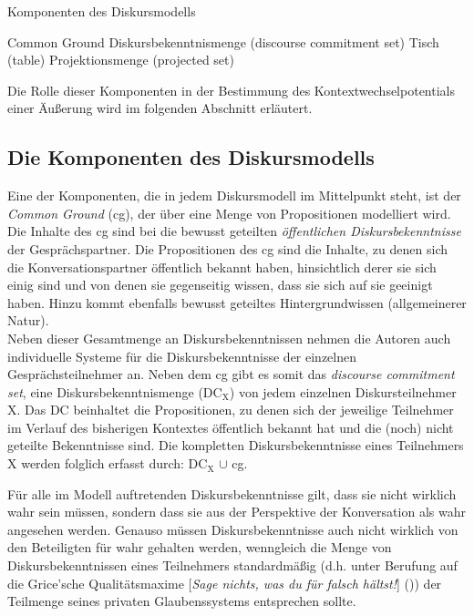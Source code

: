 \begin{exe}
	\ex\label{227} 
		Komponenten des Diskursmodells
		\begin{xlist}	
			\ex\label{227a} Common Ground 
			\ex\label{227b} Diskursbekenntnismenge (discourse commitment set) 
			\ex\label{227c} Tisch (table)	
			\ex\label{227d} Projektionsmenge (projected set) 
		\end{xlist}
\end{exe}
Die Rolle dieser Komponenten in der Bestimmung des Kontextwechselpotentials einer Äußerung wird im folgenden Abschnitt erläutert.

\subsection{Die Komponenten des Diskursmodells}\largerpage
Eine der Komponenten, die in jedem Diskursmodell im Mittelpunkt steht, ist der \textit{Common Ground} (cg), der über eine Menge von Propositionen modelliert wird. Die Inhalte des cg sind bei \citet{Farkas2010} die bewusst geteilten \emph{öffentlichen Diskursbekenntnisse} der Gesprächspartner. Die Propositionen des cg sind die Inhalte, zu denen sich die Konversationspartner öffentlich bekannt haben, hinsichtlich derer sie sich einig sind und von denen sie gegenseitig wissen, dass sie sich auf sie geeinigt haben. Hinzu kommt ebenfalls bewusst geteiltes Hintergrundwissen (allgemeine\-rer Natur).\\

\noindent 
Neben dieser Gesamtmenge an Diskursbekenntnissen nehmen die Autoren auch individuelle Systeme für die Diskursbekenntnisse der einzelnen Gesprächsteilnehmer an. Neben dem cg gibt es somit das \textit{discourse commitment set}, eine Diskursbekenntnismenge  ($\textrm{DC}_{\textrm{X}}$) von jedem einzelnen Diskursteilnehmer X. Das DC beinhaltet die Propositionen, zu denen sich der jeweilige Teilnehmer im Verlauf des bisherigen Kontextes öffentlich bekannt hat und die (noch) nicht geteilte Bekenntnisse sind. Die kompletten Diskursbekenntnisse eines Teilnehmers X werden folglich erfasst durch: $\textrm{DC}_{\textrm{X}}$ $\cup$ cg.

Für alle im Modell auftretenden Diskursbekenntnisse gilt, dass sie nicht wirklich wahr sein müssen, sondern dass sie aus der Perspektive der Konversation als wahr angesehen werden. Genauso müssen Diskursbekenntnisse auch nicht wirklich von den Beteiligten für wahr gehalten werden, wenngleich die Menge von Diskursbekenntnissen eines Teilnehmers standardmäßig (d.h. unter Berufung auf die Grice'sche Qualitätsmaxime  [\textit{Sage nichts, was du für falsch hältst!}] (\citealt{Grice1989})) der Teilmenge seines privaten Glaubenssystems entsprechen sollte.


